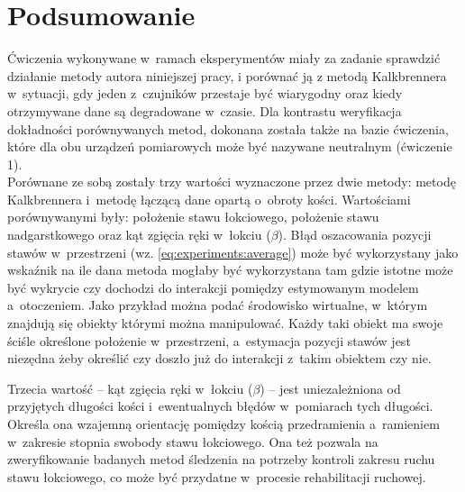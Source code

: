 \section{Podsumowanie}
																								
Ćwiczenia wykonywane w~ramach eksperymentów miały za zadanie sprawdzić działanie metody autora niniejszej pracy, i porównać ją z metodą Kalkbrennera w~sytuacji, gdy jeden z~czujników przestaje być wiarygodny oraz kiedy otrzymywane dane są degradowane w~czasie. Dla kontrastu weryfikacja dokładności porównywanych metod, dokonana została także na bazie ćwiczenia, które dla obu urządzeń pomiarowych może być nazywane neutralnym (ćwiczenie 1).\\
																								
Porównane ze sobą zostały trzy wartości wyznaczone przez dwie metody: metodę Kalkbrennera i~metodę łączącą dane opartą o~obroty kości. Wartościami porównywanymi były: położenie stawu łokciowego, położenie stawu nadgarstkowego oraz kąt zgięcia ręki w~łokciu ($\beta$). Błąd oszacowania pozycji stawów w~przestrzeni (wz. \ref{eq:experiments:average}) może być wykorzystany jako wskaźnik na ile dana metoda mogłaby być wykorzystana tam gdzie istotne może być wykrycie czy dochodzi do interakcji pomiędzy estymowanym modelem a~otoczeniem. Jako przykład można podać środowisko wirtualne, w~którym znajdują się obiekty którymi można manipulować. Każdy taki obiekt ma swoje ściśle określone położenie w~przestrzeni, a~estymacja pozycji stawów jest niezędna żeby określić czy doszło już do interakcji z~takim obiektem czy nie.
																								 
Trzecia wartość -- kąt zgięcia ręki w~łokciu ($\beta$) -- jest uniezależniona od przyjętych długości kości i~ewentualnych błędów w~pomiarach tych długości. Określa ona wzajemną orientację pomiędzy kością przedramienia a~ramieniem w~zakresie stopnia swobody stawu łokciowego. Ona też pozwala na zweryfikowanie badanych metod śledzenia na potrzeby kontroli zakresu ruchu stawu łokciowego, co może być przydatne w~procesie rehabilitacji ruchowej. \\ 

